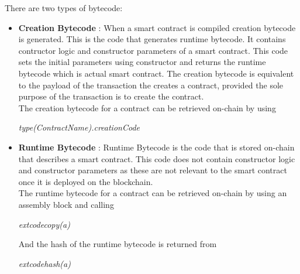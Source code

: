 \documentclass{article}
\begin{document}
There are two types of bytecode:
\begin{itemize}
    \item \textbf{Creation Bytecode} : When a smart contract is compiled creation bytecode is generated. This is the code that generates runtime bytecode. It contains contructor logic and constructor parameters of a smart contract. This code sets the initial parameters using constructor and returns the runtime bytecode which is actual smart contract. The creation bytecode is equivalent to the payload of the transaction the creates a contract, provided the sole purpose of the transaction is to create the contract.\\

    The creation bytecode for a contract can be retrieved on-chain by using
    \begin{center}
        \emph{type(ContractName).creationCode}
    \end{center} 
    \item \textbf{Runtime Bytecode} : Runtime  Bytecode is the code that is stored on-chain that describes a smart contract. This code does not contain constructor logic and constructor parameters as these are not relevant to the smart contract once it is deployed on the blockchain. \\
    The runtime bytecode for a contract can be retrieved on-chain by using an assembly block and calling
    \begin{center}
        \emph{extcodecopy(a)}
    \end{center} 
    And the hash of the runtime bytecode is returned from 
    \begin{center}
        \emph{extcodehash(a)}
    \end{center} 
\end{itemize}
\end{document}

